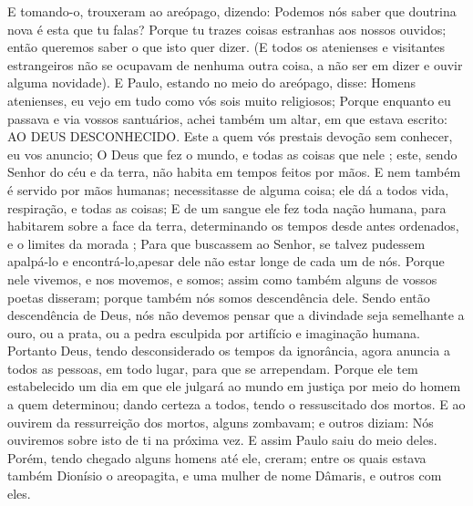 {  E tomando-o, trouxeram
{} ao areópago, dizendo: Podemos nós saber que doutrina nova é esta que tu falas?
  Porque tu trazes coisas estranhas aos nossos ouvidos; então queremos saber o que isto quer dizer.
  (E todos os atenienses e visitantes estrangeiros não se ocupavam de nenhuma outra coisa, a não ser em dizer e ouvir alguma novidade).
  E Paulo, estando no meio do areópago, disse: Homens atenienses, eu vejo em tudo como vós sois muito religiosos;
  Porque enquanto eu passava
{} e via vossos santuários, achei também um altar, em que estava escrito: AO DEUS DESCONHECIDO. Este a quem vós prestais devoção sem conhecer,
{} eu vos anuncio;
  O Deus que fez o mundo, e todas as coisas que nele
{} ; este, sendo Senhor do céu e da terra, não habita em tempos feitos por mãos.
  E nem também é servido por mãos humanas;
{} necessitasse de alguma coisa;
{} ele
{} dá a todos vida, respiração, e todas as coisas;
  E de um sangue ele fez toda nação humana, para habitarem sobre a face da terra, determinando os tempos desde antes ordenados, e o limites da morada
{} ;
  Para que buscassem ao Senhor, se talvez pudessem apalpá-lo e encontrá-lo,apesar dele não estar longe de cada um de nós.
  Porque nele vivemos, e nos movemos, e somos; assim como também alguns de vossos poetas disseram; porque também nós somos descendência dele.
  Sendo então descendência de Deus, nós não devemos pensar que a divindade seja semelhante a ouro, ou a prata, ou a pedra esculpida por artifício e imaginação humana.
  Portanto Deus, tendo desconsiderado os tempos da
{} ignorância, agora anuncia a todos as pessoas, em todo lugar, para que se arrependam.
  Porque ele tem estabelecido um dia em que ele julgará ao mundo em justiça por meio do homem a quem determinou; dando certeza a todos, tendo o ressuscitado dos mortos.
  E ao ouvirem da ressurreição dos mortos, alguns zombavam; e outros diziam: Nós ouviremos sobre isto de ti na próxima vez.
  E assim Paulo saiu do meio deles.
  Porém, tendo chegado alguns homens até ele, creram; entre os quais estava também Dionísio o areopagita, e uma mulher de nome Dâmaris, e outros com eles.
\par }

